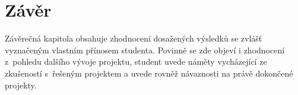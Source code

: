 \chapter*{Závěr}

Závěrečná kapitola obsahuje zhodnocení dosažených výsledků se zvlášť vyznačeným vlastním přínosem studenta.
Povinně se zde objeví i zhodnocení z~pohledu dalšího vývoje projektu, student uvede náměty vycházející ze zkušeností s~řešeným projektem a uvede rovněž návaznosti na právě dokončené projekty.

\newpage